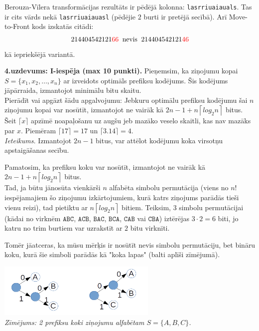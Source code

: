 \documentclass[11pt]{article}
\begin{document}
Berouza-Vīlera transformācijas rezultāts ir pēdējā kolonna: {\tt lasrriuaiauals}. 
Tas ir cits vārds nekā {\tt lasrriuaiauasl} (pēdējie $2$ burti ir pretējā secībā). 
Arī Move-to-Front kods izskatās citādi: 
$$214404542121\textcolor{red}{66}\;\;\text{nevis}\;\;214404542121\textcolor{red}{46}$$
kā iepriekšējā variantā.





{\footnotesize
\vspace{10ex}
\noindent
{\bf 4.uzdevums: I-iespēja (max 10 punkti).} 
Pieņemsim, ka ziņojumu kopai $S = \{ x_1, x_2, \ldots, x_n \}$ ar 
izveidots optimāls prefiksu kodējums. Šis kodējums jāpārraida,
izmantojot minimālu bitu skaitu.\\
Pierādīt vai apgāzt šādu 
apgalvojumu: Jebkuru optimālu prefiksu 
kodējumu šai $n$ ziņojumu kopai var nosūtīt, izmantojot ne vairāk kā 
${\displaystyle 2n - 1 + n \left\lceil log_2 n \right\rceil}$ bitus. 
Šeit $\lceil x \rceil$ apzīmē noapaļošanu uz augšu jeb 
mazāko veselo skaitli, kas nav mazāks par $x$.
Piemēram $\lceil 17 \rceil = 17$ un $\lceil 3.14 \rceil = 4$.\\
{\em Ieteikums.} Izmantojot $2n-1$ bitus, var attēlot kodējumu koka 
virsotņu apstaigāšanas secību.
}

Pamatosim, ka prefiksu koku var nosūtīt, izmantojot ne vairāk kā
${\displaystyle 2n - 1 + n \left\lceil log_2 n \right\rceil}$ bitus.\\

Tad, ja būtu jānosūta vienkārši $n$ alfabēta simbolu permutācija (viens no $n!$ 
iespējamajiem šo ziņojumu izkārtojumiem, kurā katrs ziņojums parādās tieši vienu reizi), 
tad pietiktu ar $n \left\lceil log_2 n \right\rceil$ bitiem. Teiksim, 
$3$ simbolu permutācijai (kādai no virknēm $\mathtt{ABC}$, 
$\mathtt{ACB}$, $\mathtt{BAC}$, $\mathtt{BCA}$, $\mathtt{CAB}$ vai $\mathtt{CBA}$)
iztērējas $3 \cdot 2 = 6$ biti, jo katru no trim burtiem var uzrakstīt 
ar $2$ bitu virknīti. 

Tomēr jāatceras, ka mūsu mērķis ir nosūtīt nevis simbolu permutāciju, bet 
bināru koku, kurā šie simboli parādās kā "koka lapas" (balti aplīši zīmējumā). 

\begin{center}
\includegraphics[width=3in]{prefix-trees.png}\\
{\em Zīmējums: 2 prefiksu koki ziņojumu alfabētam $S = \{ A,B,C\}$.}
\end{center}
\end{document}

